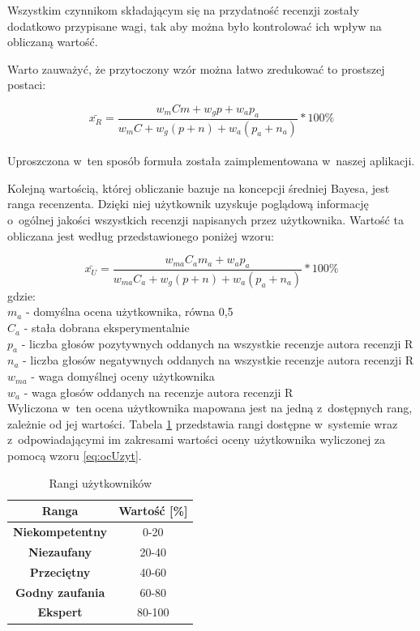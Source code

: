 Wszystkim czynnikom składającym się na przydatność recenzji zostały dodatkowo przypisane wagi, tak aby można było kontrolować ich wpływ na obliczaną wartość.

Warto zauważyć, że przytoczony wzór można łatwo zredukować to prostszej postaci:

\begin{equation}\label{eq:przydatnosc}
\bar{x_{R}}=\frac{w_{m}Cm+w_{g}{p}+w_{a}p_{a}}{w_{m}C+w_{g}(p+n)+w_{a}(p_{a}+n_{a})}*100\%
\end{equation}\\

Uproszczona w~ten sposób formuła została zaimplementowana w~naszej aplikacji.

Kolejną wartością, której obliczanie bazuje na koncepcji średniej Bayesa, jest ranga recenzenta. Dzięki niej użytkownik uzyskuje poglądową informację o~ogólnej jakości wszystkich recenzji napisanych przez użytkownika. Wartość ta obliczana jest według przedstawionego poniżej wzoru:

\begin{equation}\label{eq:ocUzyt}
\bar{x_{U}}=\frac{w_{ma}C_{a}m_{a}+w_{a}p_{a}}{w_{ma}C_{a}+w_{g}(p+n)+w_{a}(p_{a}+n_{a})}*100\%
\end{equation}
gdzie:\\
$m_{a}$ - domyślna ocena użytkownika, równa 0,5\\
$C_{a}$ - stała dobrana eksperymentalnie\\
$p_{a}$ - liczba głosów pozytywnych oddanych na wszystkie recenzje autora recenzji R\\
$n_{a}$ - liczba głosów negatywnych oddanych na wszystkie recenzje autora recenzji R\\
$w_{ma}$ - waga domyślnej oceny użytkownika\\
$w_{a}$ - waga głosów oddanych na recenzje autora recenzji R\\

Wyliczona w~ten ocena użytkownika mapowana jest na jedną z~dostępnych rang, zależnie od jej wartości. Tabela \ref{tab:rangi} przedstawia rangi dostępne w~systemie wraz z~odpowiadającymi im zakresami wartości oceny użytkownika wyliczonej za pomocą wzoru \ref{eq:ocUzyt}.

\begin{table}[H]
\centering
\begin{tabular}{|c||c|}  
\hline
\textbf{Ranga} & \textbf{Wartość [\%]} \\
\hline\hline
\textbf{Niekompetentny} & 0-20 \\  
\hline
\textbf{Niezaufany} & 20-40 \\  
\hline
\textbf{Przeciętny} & 40-60 \\  
\hline
\textbf{Godny zaufania} & 60-80 \\  
\hline
\textbf{Ekspert} & 80-100 \\  
\hline
\end{tabular}
\caption{Rangi użytkowników}\label{tab:rangi}
\end{table}


